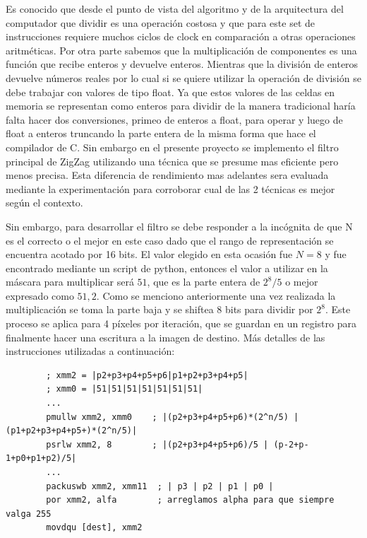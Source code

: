 \documentclass[a4paper]{article}
\newenvironment{codesnippet}{%
	\begin{Sbox}\begin{minipage}{\textwidth}\sffamily\small}%
	{\end{minipage}\end{Sbox}%
		\begin{center}%
		\vspace{-0.4cm}\colorbox{litegrey}{\TheSbox}\end{center}\vspace{0.3cm}}
\begin{document}
Es conocido que desde el punto de vista del algoritmo y de la arquitectura del computador que dividir es una operación costosa y que para este set de instrucciones requiere muchos ciclos de clock en comparación a otras operaciones aritméticas. Por otra parte sabemos que la multiplicación de componentes es una función que recibe enteros y devuelve enteros. Mientras que la división de enteros devuelve números reales por lo cual si se quiere utilizar la operación de división se debe trabajar con valores de tipo float. Ya que estos valores de las celdas en memoria se representan como enteros para dividir de la manera tradicional haría falta hacer dos conversiones, primeo de enteros a float, para operar y luego de float a enteros truncando la parte entera de la misma forma que hace el compilador de C. Sin embargo en el presente proyecto se implemento el filtro principal de ZigZag utilizando una técnica que se presume mas eficiente pero menos precisa. Esta diferencia de rendimiento mas adelantes sera evaluada mediante la experimentación para corroborar cual de las 2 técnicas es mejor según el contexto.

Sin embargo, para desarrollar el filtro se debe responder a la incógnita de que N es el correcto o el mejor en este caso dado que el rango de representación se encuentra acotado por 16 bits. El valor elegido en esta ocasión fue $N=8$ y fue encontrado mediante un script de python, entonces el valor a utilizar en la máscara para multiplicar será $51$, que es la parte entera de $2^8/5$ o mejor expresado como $51,2$. Como se menciono anteriormente una vez realizada la multiplicación se toma la parte baja y se shiftea $8$ bits para dividir por $2^8$. Este proceso se aplica para 4 píxeles por iteración, que se guardan en un registro para finalmente hacer una escritura a la imagen de destino. Más detalles de las instrucciones utilizadas a continuación: 

\begin{codesnippet}
\begin{verbatim}
        ; xmm2 = |p2+p3+p4+p5+p6|p1+p2+p3+p4+p5|
        ; xmm0 = |51|51|51|51|51|51|51|
        ...
        pmullw xmm2, xmm0    ; |(p2+p3+p4+p5+p6)*(2^n/5) | (p1+p2+p3+p4+p5+)*(2^n/5)|
        psrlw xmm2, 8        ; |(p2+p3+p4+p5+p6)/5 | (p-2+p-1+p0+p1+p2)/5|
        ...
        packuswb xmm2, xmm11  ; | p3 | p2 | p1 | p0 |
        por xmm2, alfa        ; arreglamos alpha para que siempre valga 255
        movdqu [dest], xmm2
\end{verbatim}
\end{codesnippet}
\end{document}
